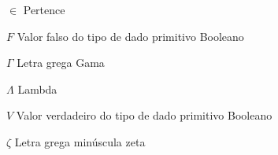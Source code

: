 \begin{simbolos}
	
	
	
	
	
	
	
	
	
	
	
	
	
	
	\item[$ \in $] Pertence
	
	\item[$F$] Valor falso do tipo de dado primitivo Booleano
	
	\item[$ \Gamma $] Letra grega Gama
	
	
	
	
	
	\item[$ \Lambda $] Lambda
	
	
	
	
	
	
	
	
	
		
	
	\item[$V$] Valor verdadeiro do tipo de dado primitivo Booleano
	
	
	
	\item[$ \zeta $] Letra grega minúscula zeta
	
\end{simbolos}